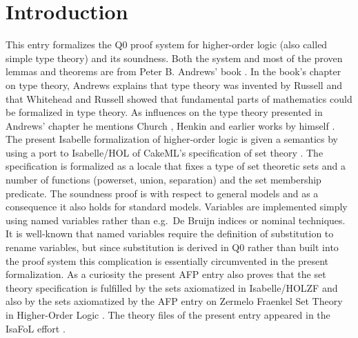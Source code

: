 \documentclass[10pt,a4paper]{article}
\begin{document}
\section{Introduction}
This entry formalizes the Q0 proof system for higher-order logic (also called simple type theory)
and its soundness.
Both the system and most of the proven lemmas and
theorems are from Peter B. Andrews' book \cite{andrews2013introduction}.
In the book's chapter on type theory, Andrews explains that type theory was invented by
Russell \cite{russell1908mathematical} and that Whitehead and Russell \cite{whiteheadrussell} showed that fundamental
parts of mathematics could be formalized in type theory.
As influences on the type theory presented in Andrews' chapter he mentions Church \cite{church1940formulation}, Henkin \cite{henkin1950completeness,henkin1963b} and earlier works by himself \cite{andrews1963reduction,andrews1972general}.
The present Isabelle formalization of higher-order logic is given a semantics by using a port to Isabelle/HOL of 
CakeML's specification of set theory \cite{DBLP:journals/jar/KumarAMO16}.
The specification is formalized as a locale that fixes a type of set theoretic sets
and a number of functions (powerset, union, separation) and the set membership predicate.
The soundness proof is with respect to general models and as a consequence it also holds for standard models.
Variables are implemented simply using named variables rather than e.g.\ De Bruijn indices or nominal techniques.
It is well-known that named variables require the definition of substitution to rename variables, but since
substitution is derived in Q0 rather than built into the proof system this complication is essentially
circumvented in the present formalization. 
As a curiosity the present AFP entry also proves that the set theory specification is fulfilled
by the sets axiomatized in Isabelle/HOLZF \cite{DBLP:conf/ictac/Obua06} and also by the sets axiomatized by the
AFP entry on Zermelo Fraenkel Set Theory in Higher-Order Logic \cite{ZFC_in_HOL-AFP}.
The theory files of the present entry appeared in the IsaFoL effort \cite{Q0IsaFoL}.
\end{document}
